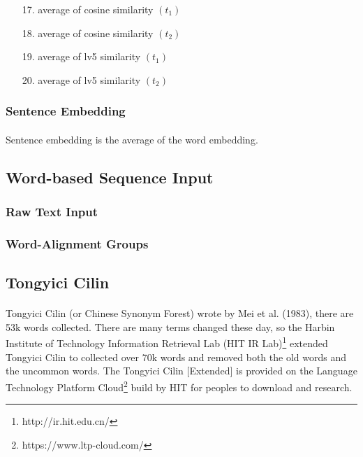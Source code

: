 \documentclass[12pt]{article}
\begin{document}
\begin{CJK*}{UTF8}{bkai}
\begin{spacing}{1.77}
\begin{enumerate}
  \item[17.] average of cosine similarity $(t_1)$
  \item[18.] average of cosine similarity $(t_2)$
  \item[19.] average of lv5 similarity $(t_1)$
  \item[20.] average of lv5 similarity $(t_2)$
\end{enumerate}

\subsubsection{Sentence Embedding}
\paragraph{}
Sentence embedding is the average of the word embedding.

\subsection{Word-based Sequence Input}
\subsubsection{Raw Text Input}

\subsubsection{Word-Alignment Groups}

\subsection{Tongyici Cilin}
\paragraph{}
Tongyici Cilin (or Chinese Synonym Forest) wrote by Mei et al. (1983)\cite{mei1983hit}, there are 53k words collected. There are many terms changed these day, so the Harbin Institute of Technology Information Retrieval Lab (HIT IR Lab)\footnote{http://ir.hit.edu.cn/} extended Tongyici Cilin to collected over 70k words and removed both the old words and the uncommon words. The Tongyici Cilin [Extended] is provided on the Language Technology Platform Cloud\footnote{https://www.ltp-cloud.com/} build by HIT for peoples to download and research.


\end{spacing}
\end{CJK*}
\end{document}
